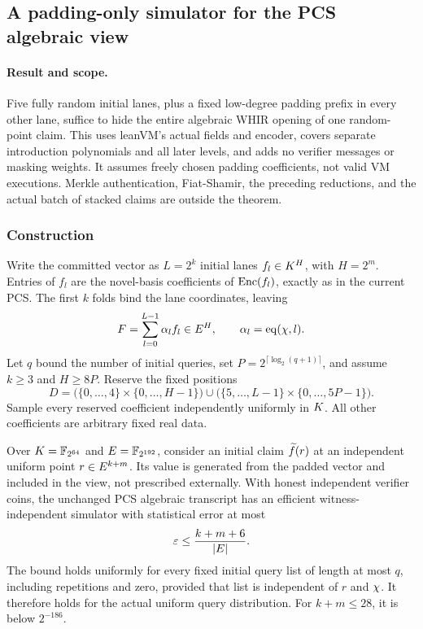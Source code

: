 \subsection{A padding-only simulator for the PCS algebraic view}\label{note:zk-pcs-padding}

\paragraph{Result and scope.} Five fully random initial lanes, plus a fixed low-degree padding prefix in every other lane, suffice to hide the entire algebraic WHIR opening of one random-point claim. This uses leanVM's actual fields and encoder, covers separate introduction polynomials and all later levels, and adds no verifier messages or masking weights. It assumes freely chosen padding coefficients, not valid VM executions. Merkle authentication, Fiat-Shamir, the preceding reductions, and the actual batch of stacked claims are outside the theorem.

\subsubsection{Construction}

Write the committed vector as $L=2^k$ initial lanes $f_l\in K^H$, with $H=2^m$. Entries of $f_l$ are the novel-basis coefficients of $\mathrm{Enc}(f_l)$, exactly as in the current PCS. The first $k$ folds bind the lane coordinates, leaving
\[
 F=\sum_{l=0}^{L-1}\alpha_l f_l\in E^H,
 \qquad \alpha_l=\operatorname{eq}(\chi,l).
\]
Let $q$ bound the number of initial queries, set $P=2^{\lceil\log_2(q+1)\rceil}$, and assume $k\ge3$ and $H\ge8P$. Reserve the fixed positions
\[
 D=\bigl(\{0,\ldots,4\}\times\{0,\ldots,H-1\}\bigr)
 \cup\bigl(\{5,\ldots,L-1\}\times\{0,\ldots,5P-1\}\bigr).
\]
Sample every reserved coefficient independently uniformly in $K$. All other coefficients are arbitrary fixed real data.

\begin{theorem}\label{thm:pcs-padding}
Over $K=\mathbb{F}_{2^{64}}$ and $E=\mathbb{F}_{2^{192}}$, consider an initial claim $\widetilde{f}(r)$ at an independent uniform point $r\in E^{k+m}$. Its value is generated from the padded vector and included in the view, not prescribed externally. With honest independent verifier coins, the unchanged PCS algebraic transcript has an efficient witness-independent simulator with statistical error at most
\[
 \varepsilon\le \frac{k+m+6}{|E|}.
\]
The bound holds uniformly for every fixed initial query list of length at most $q$, including repetitions and zero, provided that list is independent of $r$ and $\chi$. It therefore holds for the actual uniform query distribution. For $k+m\le28$, it is below $2^{-186}$.
\end{theorem}

